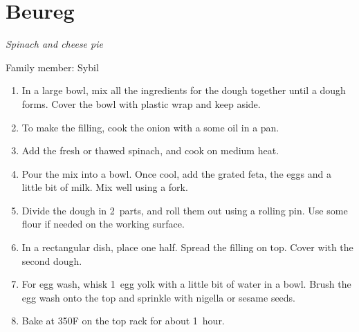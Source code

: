 \chapter{Beureg}
\label{ch:beureg}


\textit{Spinach and cheese pie}

Family member: Sybil

\begin{enumerate}
    \item In a large bowl, mix all the ingredients for the dough together until a dough forms. Cover the bowl with plastic wrap and keep aside.
    \item To make the filling, cook the onion with a some oil in a pan.
    \item Add the fresh or thawed spinach, and cook on medium heat.
    \item Pour the mix into a bowl. Once cool, add the grated feta, the eggs and a little bit of milk. Mix well using a fork.
    \item Divide the dough in 2~parts, and roll them out using a rolling pin. Use some flour if needed on the working surface.
    \item In a rectangular dish, place one half. Spread the filling on top. Cover with the second dough.
    \item For egg wash, whisk 1~egg yolk with a little bit of water in a bowl. Brush the egg wash onto the top and sprinkle with nigella or sesame seeds.
    \item Bake at 350\degree F on the top rack for about 1~hour.
\end{enumerate}
